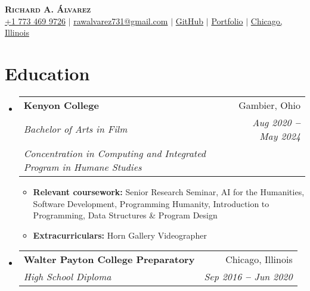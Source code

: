 \documentclass[letterpaper,11pt]{article}
\makeatletter
\newcommand{\resumeItem}[1]{
  \item\small{
    {#1 \vspace{-2pt}}
  }
}
\newcommand{\resumeSubheading}[4]{
  \vspace{-2pt}\item
    \begin{tabular*}{0.97\textwidth}[t]{l@{\extracolsep{\fill}}r}
      \textbf{#1} & #2 \\
      \textit{\small#3} & \textit{\small #4} \\
    \end{tabular*}\vspace{-7pt}
}
\newcommand{\resumeEducationHeading}[6]{
  \vspace{-2pt}\item
    \begin{tabular*}{0.97\textwidth}[t]{l@{\extracolsep{\fill}}r}
      \textbf{#1} & #2 \\
      \textit{\small#3} & \textit{\small #4} \\
      \textit{\small#5} & \textit{\small #6} \\
    \end{tabular*}\vspace{-5pt}
}
\newcommand{\resumeSubHeadingListStart}{\begin{itemize}[leftmargin=0.15in, label={}]}
\newcommand{\resumeSubHeadingListEnd}{\end{itemize}}
\newcommand{\resumeItemListStart}{\begin{itemize}}
\newcommand{\resumeItemListEnd}{\end{itemize}\vspace{-5pt}}
\makeatother
\begin{document}

\begin{center}
    \textbf{\Huge \scshape Richard A. Álvarez} \\ \vspace{3pt}
    \vspace{12pt}
    \small
    \faMobile \hspace{.5pt} \href{tel:7734699726}{+1 773 469 9726}
    $|$
    \faAt \hspace{.5pt} \href{mailto:rawalvarez731@gmail.com}{rawalvarez731@gmail.com}
    $|$
    \faGithub \hspace{.5pt} \href{https://github.com/raulduk3}{GitHub}
    $|$
    \faGlobe \hspace{.5pt} \href{https://raulduke.com}{Portfolio}
    $|$
    \faMapMarker \hspace{.5pt} \href{https://www.google.com/maps/place/Chicago,+IL/@41.833871,-87.8967704,11z/data=!3m1!4b1!4m6!3m5!1s0x880e2c3cd0f4cbed:0xafe0a6ad09c0c000!8m2!3d41.8781136!4d-87.6297982!16zL20vMDFfZDQ?entry=ttu}{Chicago, Illinois}
\end{center}




\section{Education}
  \vspace{3pt}
  \resumeSubHeadingListStart
    
    \resumeEducationHeading
      {Kenyon College
      }{Gambier, Ohio}
      {Bachelor of Arts in Film}   {Aug 2020 \textbf{--} May 2024}
      {Concentration in Computing and Integrated Program in Humane Studies} {}
		\resumeItemListStart
		    \resumeItem{\textbf{Relevant coursework:} {Senior Research Seminar, AI for the Humanities, Software Development, Programming Humanity, Introduction to Programming, Data Structures \& Program Design}}
            \resumeItem{\textbf{Extracurriculars:} {Horn Gallery Videographer}}
        \resumeItemListEnd
    
    
    \resumeSubheading
      {Walter Payton College Preparatory 
      }{Chicago, Illinois}
      {High School Diploma}{Sep 2016 \textbf{--} Jun 2020}
    
  \resumeSubHeadingListEnd
\end{document}
